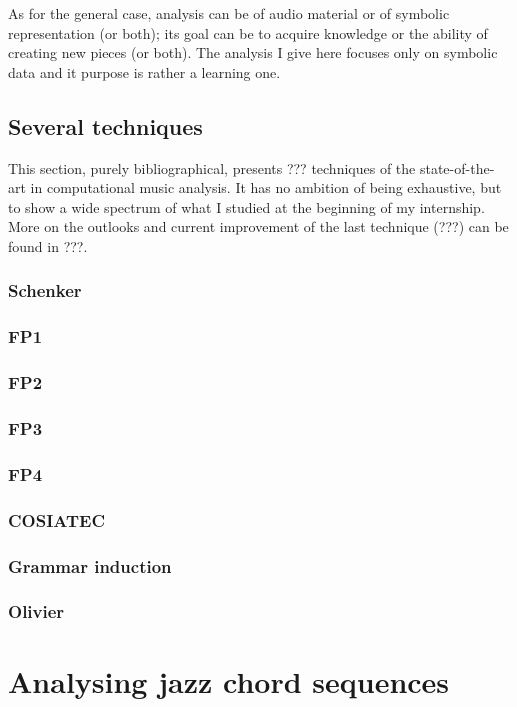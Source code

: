 \documentclass[a4paper,10pt]{article}
\begin{document}
As for the general case, analysis can be of audio material or of symbolic representation (or both); its goal can be to acquire knowledge or the ability of creating new pieces (or both). The analysis I give here focuses only on symbolic data and it purpose is rather a learning one.

\subsection{Several techniques}

This section, purely bibliographical, presents ??? techniques of the state-of-the-art in computational music analysis. It has no ambition of being exhaustive, but to show a wide spectrum of what I studied at the beginning of my internship. More on the outlooks and current improvement of the last technique (???) can be found in ???.

\subsubsection{Schenker} %
\subsubsection{FP1}
\subsubsection{FP2}
\subsubsection{FP3}
\subsubsection{FP4}
\subsubsection{COSIATEC}
\subsubsection{Grammar induction}
\subsubsection{Olivier}



\section{Analysing jazz chord sequences}
\end{document}
